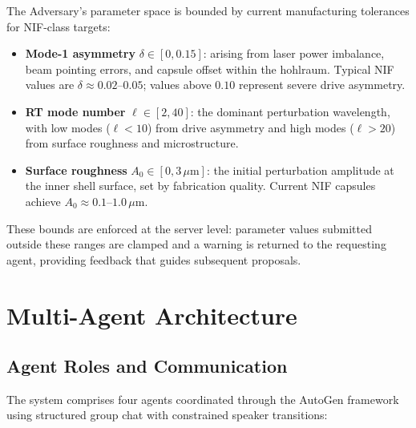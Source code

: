 \documentclass[conference]{IEEEtran}
\begin{document}
The Adversary's parameter space is bounded by current manufacturing tolerances for NIF-class targets:
\begin{itemize}
    \item \textbf{Mode-1 asymmetry} $\delta \in [0, 0.15]$: arising from laser power imbalance, beam pointing errors, and capsule offset within the hohlraum.  Typical NIF values are $\delta \approx 0.02$--$0.05$; values above $0.10$ represent severe drive asymmetry.
    \item \textbf{RT mode number} $\ell \in [2, 40]$: the dominant perturbation wavelength, with low modes ($\ell < 10$) from drive asymmetry and high modes ($\ell > 20$) from surface roughness and microstructure.
    \item \textbf{Surface roughness} $A_0 \in [0, 3\,\mu\text{m}]$: the initial perturbation amplitude at the inner shell surface, set by fabrication quality.  Current NIF capsules achieve $A_0 \approx 0.1$--$1.0\,\mu$m.
\end{itemize}

These bounds are enforced at the server level: parameter values submitted outside these ranges are clamped and a warning is returned to the requesting agent, providing feedback that guides subsequent proposals.

\section{Multi-Agent Architecture}
\label{sec:agents}

\subsection{Agent Roles and Communication}

The system comprises four agents coordinated through the AutoGen framework \cite{autogen2023} using structured group chat with constrained speaker transitions:
\end{document}
